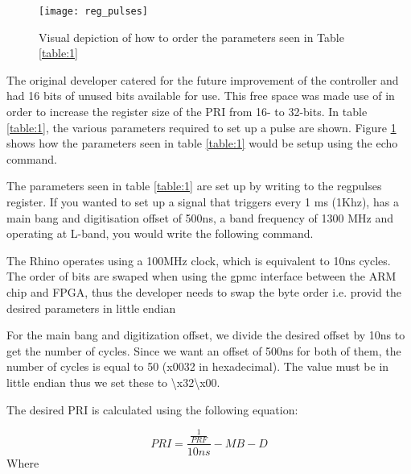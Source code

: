 \documentclass[12pt, a4paper]{article}
\begin{document}
	\begin{figure}[b]
		\centering
		\texttt{[image: reg\_pulses]}
		\caption{Visual depiction of how to order the parameters seen in Table \ref{table:1}}
		\label{fig:reg_pulses}
	\end{figure}



The original developer catered for the future improvement of the controller and had 16 bits of unused bits available for use. This free space was made use of in order to increase the register size of the PRI from 16- to 32-bits. In table \ref{table:1}, the various parameters required to set up a pulse are shown. Figure \ref{fig:reg_pulses} shows how the parameters seen in table \ref{table:1} would be setup using the echo command.


The parameters seen in table \ref{table:1} are set up by writing to the reg\textunderscore pulses register. If you wanted to set up a signal that triggers every 1 ms (1Khz), has a main bang and digitisation offset of 500ns, a band frequency of 1300 MHz and operating at L-band, you would write the following command. 




The Rhino operates using a 100MHz clock, which is equivalent to 10ns cycles. The order of bits are swaped when using the gpmc interface between the ARM chip and FPGA, thus the developer needs to swap the byte order i.e. provid the desired parameters in little endian

For the main bang and digitization offset, we divide the desired offset by 10ns to get the number of cycles. Since we want an offset of 500ns for both of them, the number of cycles is equal to 50 (x0032 in hexadecimal). The value must be in little endian thus we set these to \textbackslash x32\textbackslash x00.


The desired PRI is calculated using the following equation:

	\[ 
		PRI = \frac{\frac{1}{PRF}}{10ns} - MB - D
	\]
Where
 
\end{document}
